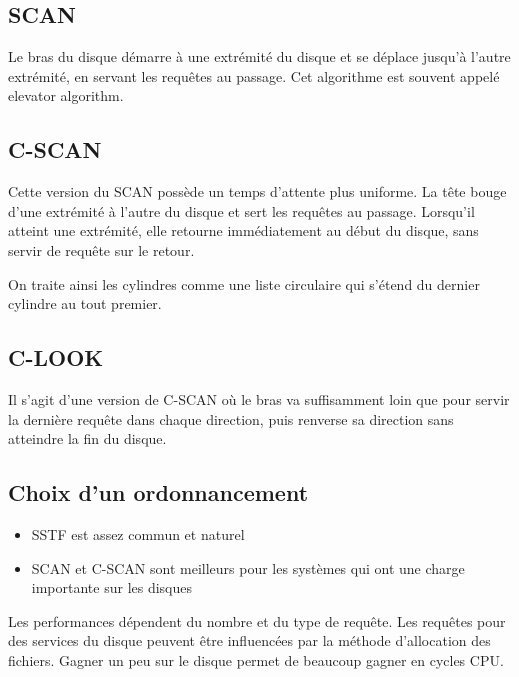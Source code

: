 	
	\subsection{SCAN}
	
	Le bras du disque démarre à une extrémité du disque et se déplace jusqu'à l'autre extrémité, en servant les requêtes au passage.  Cet algorithme est souvent appelé elevator algorithm.
	
	
	\subsection{C-SCAN}
	
	Cette version du SCAN possède un temps d'attente plus uniforme. La tête bouge d'une extrémité à l'autre du disque et sert les requêtes au passage. Lorsqu'il atteint une extrémité, elle retourne immédiatement au début du disque, sans servir de requête sur le retour.
	
	On traite ainsi les cylindres comme une liste circulaire qui s'étend du dernier cylindre au tout premier.
	
	
	\subsection{C-LOOK}
	
	Il s'agit d'une version de C-SCAN où le bras va suffisamment loin que pour servir la dernière requête dans chaque direction, puis renverse sa direction sans atteindre la fin du disque.
	
	
	\subsection{Choix d'un ordonnancement}
	
	\begin{itemize}
		\item SSTF est assez commun et naturel
		\item SCAN et C-SCAN sont meilleurs pour les systèmes qui ont une charge importante sur les disques
	\end{itemize}
	
	Les performances dépendent du nombre et du type de requête. Les requêtes pour des services du disque peuvent être influencées par la méthode d'allocation des fichiers. Gagner un peu sur le disque permet de beaucoup gagner en cycles CPU.
	
